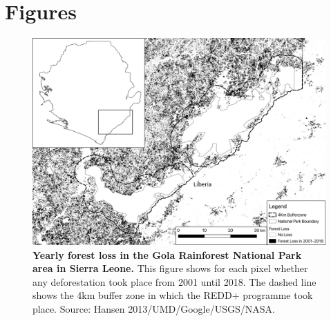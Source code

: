 \documentclass[
]{article}
\begin{document}
\newpage

\hypertarget{figures}{%
\section*{Figures}\label{figures}}

\begin{figure}[H]

{\centering \includegraphics[width=0.7\linewidth]{3_maps/grnp_forestloss_buffer} 

}

\caption{\textbf{Yearly forest loss in the Gola Rainforest National Park area in Sierra Leone.} This figure shows for each pixel whether any deforestation took place from 2001 until 2018. The dashed line shows the 4km buffer zone in which the REDD+ programme took place. Source: Hansen 2013/UMD/Google/USGS/NASA.}\label{fig:figForestlossGola}
\end{figure}
\end{document}

